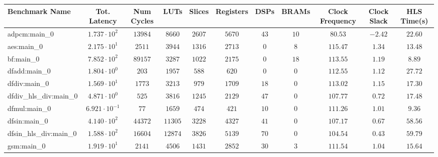 \begin{tabular}{|l|c|c|c|c|c|c|c|c|c|c|}
\hline
Benchmark Name          & Tot. Latency            & Num Cycles & LUTs      & Slices    & Registers & DSPs    & BRAMs   & Clock Frequency & Clock Slack & HLS Time(s) \\
\hline
adpcm:main\_0           & $ 1.737 \cdot 10^{2}  $ & $ 13984  $ & $ 8660  $ & $ 2607  $ & $ 5670  $ & $ 43  $ & $ 10  $ & $ 80.53       $ & $ -2.42   $ & $ 22.60   $ \\
aes:main\_0             & $ 2.175 \cdot 10^{1}  $ & $ 2511   $ & $ 3944  $ & $ 1316  $ & $ 2713  $ & $ 0   $ & $ 8   $ & $ 115.47      $ & $ 1.34    $ & $ 13.48   $ \\
bf:main\_0              & $ 7.852 \cdot 10^{2}  $ & $ 89157  $ & $ 3287  $ & $ 1022  $ & $ 2175  $ & $ 0   $ & $ 18  $ & $ 113.55      $ & $ 1.19    $ & $ 8.89    $ \\
dfadd:main\_0           & $ 1.804 \cdot 10^{0}  $ & $ 203    $ & $ 1957  $ & $ 588   $ & $ 620   $ & $ 0   $ & $ 0   $ & $ 112.55      $ & $ 1.12    $ & $ 27.72   $ \\
dfdiv:main\_0           & $ 1.569 \cdot 10^{1}  $ & $ 1773   $ & $ 3213  $ & $ 979   $ & $ 1709  $ & $ 18  $ & $ 0   $ & $ 113.02      $ & $ 1.15    $ & $ 17.30   $ \\
dfdiv\_hls\_div:main\_0 & $ 4.871 \cdot 10^{0}  $ & $ 525    $ & $ 3816  $ & $ 1245  $ & $ 2129  $ & $ 47  $ & $ 0   $ & $ 107.77      $ & $ 0.72    $ & $ 17.48   $ \\
dfmul:main\_0           & $ 6.921 \cdot 10^{-1} $ & $ 77     $ & $ 1659  $ & $ 474   $ & $ 421   $ & $ 10  $ & $ 0   $ & $ 111.26      $ & $ 1.01    $ & $ 9.36    $ \\
dfsin:main\_0           & $ 4.140 \cdot 10^{2}  $ & $ 44372  $ & $ 11305 $ & $ 3228  $ & $ 4327  $ & $ 41  $ & $ 0   $ & $ 107.17      $ & $ 0.67    $ & $ 58.56   $ \\
dfsin\_hls\_div:main\_0 & $ 1.588 \cdot 10^{2}  $ & $ 16604  $ & $ 12874 $ & $ 3826  $ & $ 5139  $ & $ 70  $ & $ 0   $ & $ 104.54      $ & $ 0.43    $ & $ 59.79   $ \\
gsm:main\_0             & $ 1.919 \cdot 10^{1}  $ & $ 2141   $ & $ 4506  $ & $ 1431  $ & $ 2852  $ & $ 30  $ & $ 3   $ & $ 111.54      $ & $ 1.04    $ & $ 15.64   $ \\

\end{tabular}
